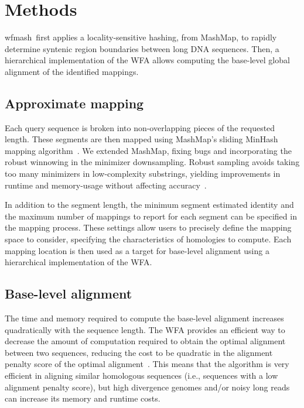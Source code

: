 \documentclass{bioinfo}
\newcommand{\wfmash}{wfmash}
\begin{document}


    \section{Methods}

    \wfmash\ first applies a locality-sensitive hashing, from MashMap, to rapidly determine syntenic region
    boundaries between long DNA sequences. Then, a hierarchical implementation of the WFA allows computing the
    base-level global alignment of the identified mappings.

    \subsection{Approximate mapping}

    Each query sequence is broken into non-overlapping pieces of the requested length. These segments are then
    mapped using MashMap's sliding MinHash mapping algorithm~\citep{30423094}. We extended MashMap, fixing bugs
    and incorporating the robust winnowing \citep{Schleimer S. et al.  (2003)} in the minimizer downsampling.
    Robust sampling avoids taking too many minimizers in low-complexity substrings, yielding improvements in
    runtime and memory-usage without affecting accuracy~\citep{32657365}.


    In addition to the segment length, the minimum segment estimated identity and the maximum number of
    mappings to report for each segment can be specified in the mapping process. These settings allow users
    to precisely define the mapping space to consider, specifying the characteristics of homologies to compute.
    Each mapping location is then used as a target for base-level alignment using a hierarchical implementation
    of the WFA.

    \subsection{Base-level alignment}

    The time and memory required to compute the base-level alignment increases quadratically with the sequence
    length. The WFA provides an efficient way to decrease the amount of computation required to obtain the
    optimal alignment between two sequences, reducing the cost to be quadratic in the alignment penalty score
    of the optimal alignment~\citep{32915952}. This means that the algorithm is very efficient in aligning
    similar homologous sequences (i.e., sequences with a low alignment penalty score), but high divergence
    genomes and/or noisy long reads can increase its memory and runtime costs.
\end{document}
